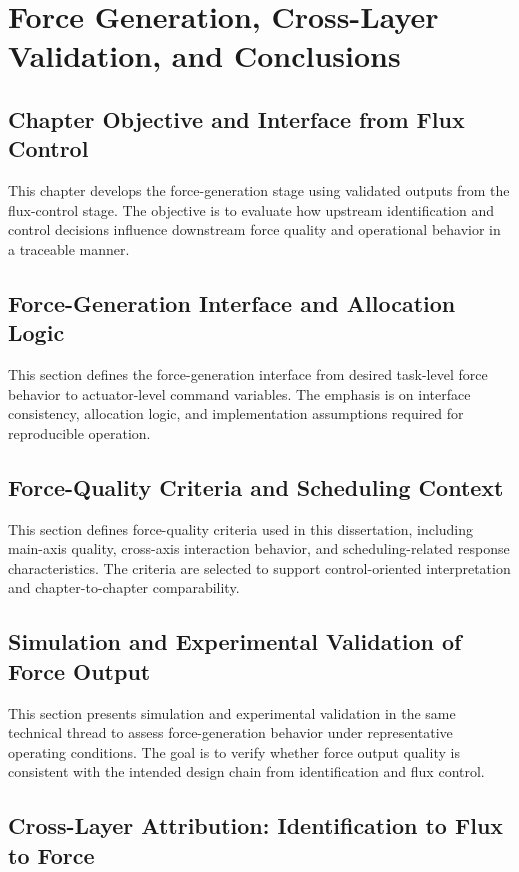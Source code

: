 \chapter{Force Generation, Cross-Layer Validation, and Conclusions}

\section{Chapter Objective and Interface from Flux Control}

This chapter develops the force-generation stage using validated outputs from the flux-control stage. The objective is to evaluate how upstream identification and control decisions influence downstream force quality and operational behavior in a traceable manner.

\section{Force-Generation Interface and Allocation Logic}

This section defines the force-generation interface from desired task-level force behavior to actuator-level command variables. The emphasis is on interface consistency, allocation logic, and implementation assumptions required for reproducible operation.

\section{Force-Quality Criteria and Scheduling Context}

This section defines force-quality criteria used in this dissertation, including main-axis quality, cross-axis interaction behavior, and scheduling-related response characteristics. The criteria are selected to support control-oriented interpretation and chapter-to-chapter comparability.

\section{Simulation and Experimental Validation of Force Output}

This section presents simulation and experimental validation in the same technical thread to assess force-generation behavior under representative operating conditions. The goal is to verify whether force output quality is consistent with the intended design chain from identification and flux control.

\section{Cross-Layer Attribution: Identification to Flux to Force}

